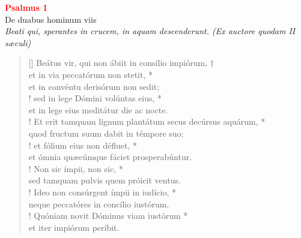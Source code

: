 


\def\greinitialformat#1{%
{\fontsize{39}{39}\selectfont #1}%
}




\vspace{0.3cm}
\begin{center}
 \textcolor{red}{\large \bf Psalmus 1}\\
De duabus hominum viis\\
\textit{\small Beati qui, sperantes in crucem, in aquam descenderunt. (Ex auctore quodam II sæculi)}
\end{center}
\begin{verse}[\versewidth]
Beátus vir, qui non ábiit in consílio impiórum, †\\
et in via peccatórum non stetit, *\\
et in convéntu derisórum non sedit;\\!
\vin  sed in lege Dómini volúntas eius, *\\
\vin  et in lege eius meditátur die ac nocte.\\!
Et erit tamquam lignum \verselinebreak plantátum secus decúrsus aquárum, *\\
quod fructum suum dabit in témpore suo;\\!
\vin  et fólium eius non défluet, *\\
\vin  et ómnia quæcúmque fáciet prosperabúntur.\\!
Non sic ímpii, non sic, *\\
sed tamquam pulvis quem próicit ventus.\\!
\vin  Ideo non consúrgent ímpii in iudício, *\\
\vin  neque peccatóres in concílio iustórum.\\!
Quóniam novit Dóminus viam iustórum *\\
et iter impiórum períbit.\\
\end{verse}
\vspace{1cm}


